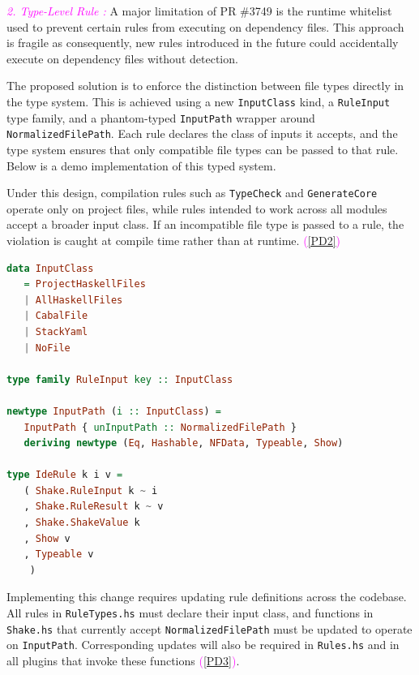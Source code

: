 \documentclass[a4paper,12pt]{article}
\begin{document}
\textcolor{magenta}{\textit{2. Type-Level Rule :  }}
A major limitation of PR \#3749 is the runtime whitelist used to prevent certain rules from executing on dependency files. This approach is fragile as consequently, new rules introduced in the future could accidentally execute on dependency files without detection.
\vspace{0.6em}

The proposed solution is to enforce the distinction between file types directly in the type system. This is achieved using a new \texttt{InputClass} kind, a \texttt{RuleInput} type family, and a phantom-typed \texttt{InputPath} wrapper around \texttt{NormalizedFilePath}. Each rule declares the class of inputs it accepts, and the type system ensures that only compatible file types can be passed to that rule. Below is a demo implementation of this typed system.

\vspace{0.6em}
Under this design, compilation rules such as \texttt{TypeCheck} and \texttt{GenerateCore} operate only on project files, while rules intended to work across all modules accept a broader input class. If an incompatible file type is passed to a rule, the violation is caught at compile time rather than at runtime. \textcolor{magenta}{(\ref{PD2})}
\vspace{0.6em}

\begin{lstlisting}[language=Haskell]
data InputClass
   = ProjectHaskellFiles
   | AllHaskellFiles
   | CabalFile
   | StackYaml
   | NoFile

type family RuleInput key :: InputClass

newtype InputPath (i :: InputClass) =
   InputPath { unInputPath :: NormalizedFilePath }
   deriving newtype (Eq, Hashable, NFData, Typeable, Show)

type IdeRule k i v =
   ( Shake.RuleInput k ~ i
   , Shake.RuleResult k ~ v
   , Shake.ShakeValue k
   , Show v
   , Typeable v
    )
\end{lstlisting}
\vspace{0.6em}

Implementing this change requires updating rule definitions across the codebase. All rules in \texttt{RuleTypes.hs} must declare their input class, and functions in \texttt{Shake.hs} that currently accept \texttt{NormalizedFilePath} must be updated to operate on \texttt{InputPath}. Corresponding updates will also be required in \texttt{Rules.hs} and in all plugins that invoke these functions \textcolor{magenta}{(\ref{PD3})}.
\end{document}
